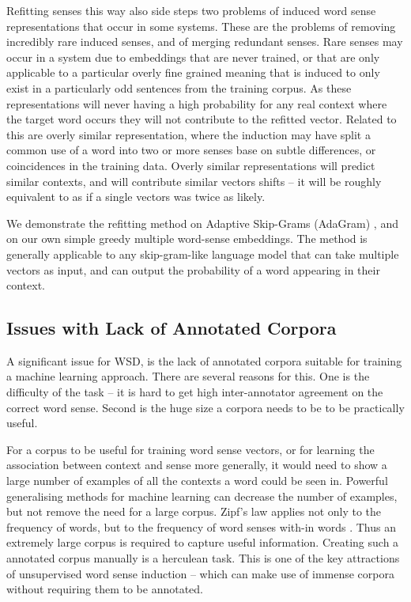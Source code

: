 \documentclass{sig-alternate}
\begin{document}
Refitting senses this way also side steps two problems of induced word sense representations that occur in some systems. These are the problems of removing incredibly rare induced senses, and of merging redundant senses.
Rare senses may occur in a system due to embeddings that are never trained, or that are only applicable to a particular overly fine grained meaning that is induced to only exist in a particularly odd sentences from the training corpus. As these representations will never having a high probability for any real context where the target word occurs they will not contribute to the refitted vector. Related to this are overly similar representation, where the induction may have split a common use of a word into two or more senses base on subtle differences, or coincidences in the training data. Overly similar representations will  predict similar contexts, and will contribute similar vectors shifts -- it will be roughly equivalent to as if a single vectors was twice as likely.


We demonstrate the refitting method on Adaptive Skip-Grams (AdaGram) \parencite{AdaGrams}, and on our own simple greedy multiple word-sense embeddings. The method is generally applicable to any skip-gram-like language model that can take multiple vectors as input, and can output the probability of a word appearing in their context.

\subsection{Issues with Lack of Annotated Corpora} \label{corpussize}
A significant issue for WSD, is the lack of annotated corpora suitable for training a machine learning approach.
There are several reasons for this. One is the difficulty of the task -- it is hard to get high inter-annotator agreement on the correct word sense. Second is the huge size a corpora needs to be to be practically useful.

For a corpus to be useful for training word sense vectors, or for learning the association between context and sense more generally, it would need to show a large number of examples of all the contexts a word could be seen in. Powerful generalising methods for machine learning can decrease the number of examples, but not remove the need for a large corpus.
Zipf's law \parencite{zipf1949human} applies not only to the frequency of words, but to the frequency of word senses with-in words \parencite{Kilgarriff2004}. Thus an extremely large corpus is required to capture useful information. Creating such a annotated corpus manually is a herculean task. This is one of the key attractions of unsupervised word sense induction -- which can make use of immense corpora without requiring them to be annotated.
\end{document}
